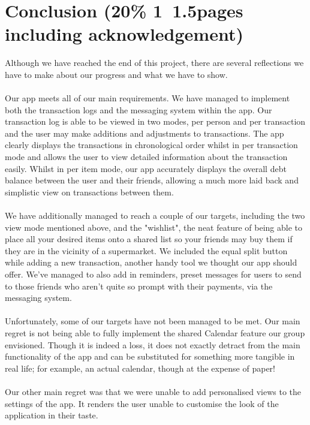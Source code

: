 \documentclass[a4paper,11pt]{article}
\begin{document}
\section*{Conclusion (20\% 1~1.5pages including acknowledgement)}
Although we have reached the end of this project, there are several reflections we have to make about our progress and what we have to show. 
\\
\\Our app meets all of our main requirements. We have managed to implement both the transaction logs and the messaging system within the app. Our transaction log is able to be viewed in two modes, per person and per transaction and the user may make additions and adjustments to transactions. The app clearly displays the transactions in chronological order whilst in per transaction mode and allows the user to view detailed information about the transaction easily. Whilst in per item mode, our app accurately displays the overall debt balance between the user and their friends, allowing a much more laid back and simplistic view on transactions between them.
\\
\\We have additionally managed to reach a couple of our targets, including the two view mode mentioned above, and the "wishlist", the neat feature of being able to place all your desired items onto a shared list so your friends may buy them if they are in the vicinity of a supermarket. We included the equal split button while adding a new transaction, another handy tool we thought our app should offer. We've managed to also add in reminders, preset messages for users to send to those friends who aren't quite so prompt with their payments, via the messaging system.
\\
\\Unfortunately, some of our targets have not been managed to be met. Our main regret is not being able to fully implement the shared Calendar feature our group envisioned. Though it is indeed a loss, it does not exactly detract from the main functionality of the app and can be substituted for something more tangible in real life; for example, an actual calendar, though at the expense of paper!
\\
\\Our other main regret was that we were unable to add personalised views to the settings of the app. It renders the user unable to customise the look of the application in their taste. 
\\
\\
\end{document}
